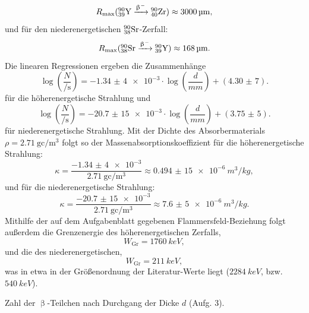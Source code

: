 \begin{equation}
R_\mathrm{max} (\element{Y}{39}{90} \xrightarrow{\upbeta^-} \element{Zr}{40}{90}) \approx \SI{3000}{\micro\meter},
\end{equation}
und für den niederenergetischen $\element{Sr}{38}{90}$-Zerfall:
\begin{equation}
R_\mathrm{max} (\element{Sr}{38}{90} \xrightarrow{\upbeta^-} \element{Y}{39}{90}) \approx \SI{168}{\micro\meter}.
\end{equation}
Die linearen Regressionen ergeben die Zusammenhänge
\begin{equation}
\log\left(\frac{N}{\si{\per\second}}\right) = \num{-1,34(4)e-3} \cdot \log\left(\frac{d}{\si{mm}}\right) + (\num{4,30(7)}).
\end{equation}
für die höherenergetische Strahlung und
\begin{equation}
\log\left(\frac{N}{\si{\per\second}}\right) = \num{-20,7(15)e-3} \cdot \log\left(\frac{d}{\si{mm}}\right) + (\num{3,75(5)}).
\end{equation}
für niederenergetische Strahlung. Mit der Dichte des Absorbermaterials $\rho=\SI{2,71}{\gram\centi\per\meter^3}$ folgt so der Massenabsorptionskoeffizient für die höherenergetische Strahlung:
\begin{equation}
\kappa = \frac{\num{-1,34(4)e-3}}{\SI{2,71}{\gram\centi\per\meter^3}} \approx \SI{0,494(15)e-6}{m^3/kg},
\end{equation}
und für die niederenergetische Strahlung:
\begin{equation}
\kappa = \frac{\num{-20,7(15)e-3}}{\SI{2,71}{\gram\centi\per\meter^3}} \approx \SI{7,6(5)e-6}{m^3/kg}.
\end{equation}
Mithilfe der auf dem Aufgabenblatt gegebenen Flammersfeld-Beziehung folgt außerdem die Grenzenergie des höherenergetischen Zerfalls,
\begin{equation}
W_\mathrm{Gr} = \SI{1760}{keV},
\end{equation}
und die des niederenergetischen,
\begin{equation}
W_\mathrm{Gr} = \SI{211}{keV},
\end{equation}
was in etwa in der Größenordnung der Literatur-Werte liegt ($\SI{2284}{keV}$, bzw. $\SI{540}{keV}$).

\begin{table}[tb]
	\centering
	\caption{Zahl der $\upbeta$-Teilchen nach Durchgang der Dicke $d$ (Aufg. 3).}
	\label{tab:ii_3}
	
	\vspace{8mm}
\end{table}

